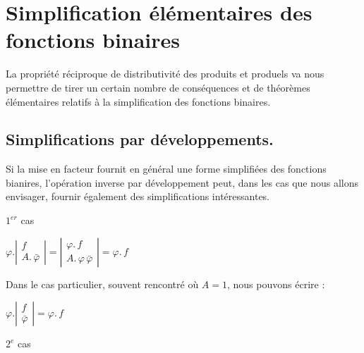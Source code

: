 \newpage 

\section{Simplification élémentaires des fonctions binaires}

La propriété réciproque de distributivité des produits et produels
va nous permettre de tirer un certain nombre de conséquences et de
théorèmes élémentaires relatifs à la simplification des fonctions
binaires.

\subsection{Simplifications par développements. }

Si la mise en facteur fournit en général une forme simplifiées des
fonctions bianires, l'opération inverse par développement peut, dans
les cas que nous allons envisager, fournir également des simplifications
intéressantes. 

$1^{er}$ cas

\begin{center}
$\varphi.\left|\begin{array}{c}
f\\
A.\,\bar{\varphi}
\end{array}\right|=\left|\begin{array}{c}
\varphi.\,f\\
A.\,\varphi\,\bar{\varphi}
\end{array}\right|=\varphi.\,f$
\end{center}

Dans le cas particulier, souvent rencontré où $A=1$, nous pouvons
écrire : 

\begin{center}
$\varphi.\left|\begin{array}{c}
f\\
\bar{\varphi}
\end{array}\right|=\varphi.\,f$
\end{center}

$2^{e}$ cas

